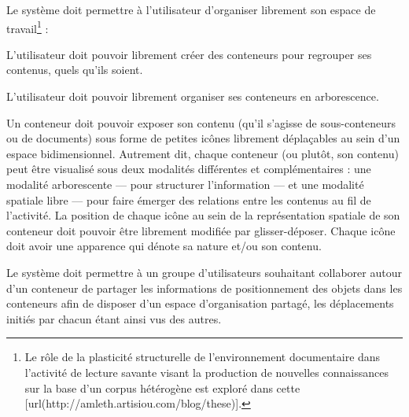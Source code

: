 \startchapter[title={Espace de travail}]

\startsection[title={Organisation et plasticité de l'espace de travail}]

\fon{}
Le système doit permettre à l'utilisateur d'organiser librement son espace de travail\footnote{Le rôle de la plasticité structurelle de l'environnement documentaire dans l'activité de lecture savante visant la production de nouvelles connaissances sur la base d'un corpus hétérogène est exploré dans cette [url(http://amleth.artisiou.com/blog/these)].} :

\startitemize
	\item
	L'utilisateur doit pouvoir librement créer des conteneurs pour regrouper ses contenus, quels qu'ils soient.
	\item
	L'utilisateur doit pouvoir librement organiser ses conteneurs en arborescence.
	\item
	Un conteneur doit pouvoir exposer son contenu (qu'il s'agisse de sous-conteneurs ou de documents) sous forme de petites icônes librement déplaçables au sein d'un espace bidimensionnel.
	Autrement dit, chaque conteneur (ou plutôt, son contenu) peut être visualisé sous deux modalités différentes et complémentaires : une modalité arborescente --- pour structurer l'information --- et une modalité spatiale libre --- pour faire émerger des relations entre les contenus au fil de l'activité.
	La position de chaque icône au sein de la représentation spatiale de son conteneur doit pouvoir être librement modifiée par glisser-déposer.
	Chaque icône doit avoir une apparence qui dénote sa nature et/ou son contenu.
\stopitemize

\fon{}
Le système doit permettre à un groupe d'utilisateurs souhaitant collaborer autour d'un conteneur de partager les informations de positionnement des objets dans les conteneurs afin de disposer d'un espace d'organisation partagé, les déplacements initiés par chacun étant ainsi vus des autres.

\startsection[title={Éléments de modélisation}]

